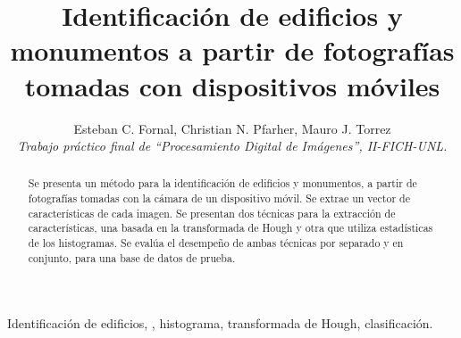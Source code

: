 \documentclass[conference,spanish,a4paper,10pt,oneside,final]{tfmpd}
\begin{document}
\title{Identificación de edificios y monumentos a partir de fotografías
tomadas con dispositivos móviles}
\author{Esteban C. Fornal, Christian N. Pfarher, Mauro J. Torrez\\
\textit{Trabajo práctico final de ``Procesamiento Digital de
Imágenes'', II-FICH-UNL.}}
\maketitle
%
%
%
%
\begin{abstract}
Se presenta un método para la identificación de edificios y monumentos, a
partir de fotografías tomadas con la cámara de un dispositivo móvil.
Se extrae un vector de características  de cada imagen.
Se presentan dos técnicas para la extracción de
características, una basada en la transformada de Hough y otra que
utiliza estadísticas de los histogramas.
Se evalúa el desempeño 
de ambas técnicas por separado y en
conjunto, para una base de datos de prueba.
\end{abstract}
%
%
%
%
\begin{keywords}
Identificación de edificios, ,
histograma, transformada de Hough, clasificación.
\end{keywords}
%
%
%
%
\end{document}
